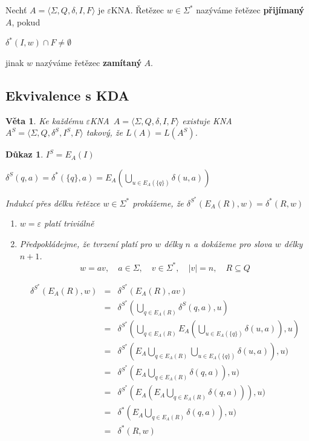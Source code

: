 \documentclass[10pt, a4paper, titlepage]{article}
\theoremstyle{note}
\newtheorem{veta}{Věta}
\newtheorem{dukaz}{Důkaz}
\newcommand{\ekna}{$\varepsilon$KNA}		%
\begin{document}
Nechť $A=\langle\Sigma,Q,\delta,I,F\rangle$ je \ekna. Řetězec $w \in \Sigma^*$ nazýváme řetězec \textbf{přijímaný} $A$, pokud

$\delta^*(I,w) \cap F \neq \emptyset$

jinak $w$ nazýváme řetězec \textbf{zamítaný} $A$.

\subsection{Ekvivalence s KDA}

\begin{veta}
Ke každému \ekna \ $A=\langle\Sigma,Q,\delta,I,F\rangle$ existuje KNA $A^S=\langle\Sigma,Q,\delta^S,I^S,F\rangle$ takový, že $L(A)=L(A^S)$.
\end{veta}
 
 \begin{dukaz}
 $I^S=E_A(I)$
 
 $\delta^S(q,a)=\delta^*(\lbrace q \rbrace , a)= E_A(\bigcup_{u \in E_A(\lbrace q \rbrace )} \delta(u,a))$ 
 
 Indukcí přes délku řetězce $w \in \Sigma^*$ prokážeme, že $ \delta^{S^*} (E_A(R),w)=\delta^*(R,w)$
 
 \begin{enumerate}
 \item
 $w=\varepsilon$ platí triviálně
 \item
 Předpokládejme, že tvrzení platí pro $w$ délky $n$ a dokážeme pro slova $w$ délky $n+1$.
$$
w = av, \quad a \in \Sigma, \quad v \in \Sigma^*, \quad |v|=n, \quad R \subseteq Q
$$ 
 
 \begin{eqnarray*}
	\delta^{S^*} (E_A(R),w) &=& \delta^{S^*} (E_A(R),av) \\
	&=& \delta^{S^*} (\bigcup_{q \in E_A(R)} \delta^S(q,a), u) \\
	&=& \delta^{S^*} (\bigcup_{q \in E_A(R)} E_A(\bigcup_{u \in E_A(\lbrace q \rbrace)} \delta (u,a)),u) \\
	&=& \delta^{S^*} (E_{A} \bigcup_{q \in E_A(R)} \bigcup_{u \in E_A(\lbrace q \rbrace)} \delta (u,a)),u) \\
	&=& \delta^{S^*} (E_{A} \bigcup_{q \in E_A(R)} \delta (q,a)),u) \\
	&=& \delta^{S^*} (E_{A} (E_{A} \bigcup_{q \in E_A(R)} \delta (q,a))),u) \\
	&=& \delta^{*} (E_{A} \bigcup_{q \in E_A(R)} \delta (q,a)),u) \\
	&=& \delta^{*} (R, w)
 \end{eqnarray*}
 \end{enumerate} 
 \end{dukaz}
\end{document}
